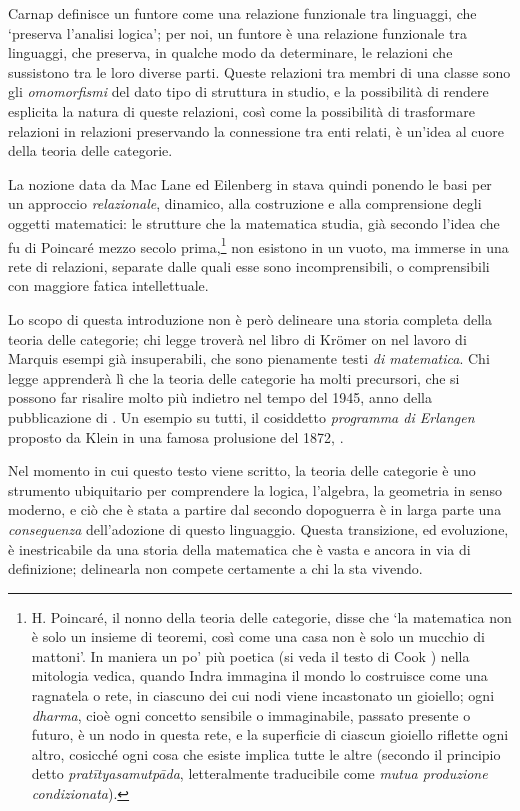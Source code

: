 Carnap definisce un funtore come una relazione funzionale tra linguaggi, che `preserva l'analisi logica'; per noi, un funtore è una relazione funzionale tra linguaggi, che preserva, in qualche modo da determinare, le relazioni che sussistono tra le loro diverse parti. Queste relazioni tra membri di una classe sono gli \emph{omomorfismi} del dato tipo di struttura in studio, e la possibilità di rendere esplicita la natura di queste relazioni, così come la possibilità di trasformare relazioni in relazioni preservando la connessione tra enti relati, è un'idea al cuore della teoria delle categorie.

La nozione data da Mac Lane ed Eilenberg in \cite{gtone} stava quindi ponendo le basi per un approccio \emph{relazionale}, dinamico, alla costruzione e alla comprensione degli oggetti matematici: le strutture che la matematica studia, già secondo l'idea che fu di Poincaré mezzo secolo prima,\footnote{H. Poincaré, il nonno della teoria delle categorie, disse che `la matematica non è solo un insieme di teoremi, così come una casa non è solo un mucchio di mattoni'. In maniera un po' più poetica (si veda il testo di Cook \cite{Cook1977-ry}) nella mitologia vedica, quando Indra immagina il mondo lo costruisce come una ragnatela o rete, in ciascuno dei cui nodi viene incastonato un gioiello; ogni \emph{dharma}, cioè ogni concetto sensibile o immaginabile, passato presente o futuro, è un nodo in questa rete, e la superficie di ciascun gioiello riflette ogni altro, cosicché ogni cosa che esiste implica tutte le altre (secondo il principio detto \emph{pratītyasamutpāda}, letteralmente traducibile come \emph{mutua produzione condizionata}).} non esistono in un vuoto, ma immerse in una rete di relazioni, separate dalle quali esse sono incomprensibili, o comprensibili con maggiore fatica intellettuale.

\medskip
Lo scopo di questa introduzione non è però delineare una storia completa della teoria delle categorie; chi legge troverà nel libro di Kr\"omer \cite{kromer} on nel lavoro di Marquis \cite{marquis} esempi già insuperabili, che sono pienamente testi \emph{di matematica}. Chi legge apprenderà lì che la teoria delle categorie ha molti precursori, che si possono far risalire molto più indietro nel tempo del 1945, anno della pubblicazione di \cite{gtone}. Un esempio su tutti, il cosiddetto \emph{programma di Erlangen} proposto da Klein in una famosa prolusione del 1872, \cite{Klein1893}.

Nel momento in cui questo testo viene scritto, la teoria delle categorie è uno strumento ubiquitario per comprendere la logica, l'algebra, la geometria in senso moderno, e ciò che è stata a partire dal secondo dopoguerra è in larga parte una \emph{conseguenza} dell'adozione di questo linguaggio. Questa transizione, ed evoluzione, è inestricabile da una storia della matematica che è vasta e ancora in via di definizione; delinearla non compete certamente a chi la sta vivendo.

